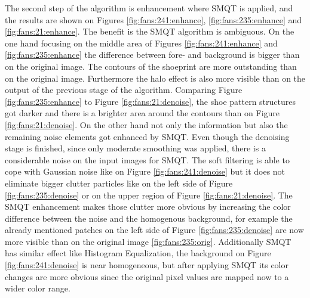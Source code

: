 \documentclass[draft,final]{vutinfth} %
\begin{document}
\par
The second step of the algorithm is enhancement where SMQT is applied, and the results are shown on Figures \ref{fig:fans:241:enhance}, \ref{fig:fans:235:enhance} and \ref{fig:fans:21:enhance}.
The benefit is the SMQT algorithm is ambiguous.
On the one hand focusing on the middle area of Figures  \ref{fig:fans:241:enhance} and \ref{fig:fans:235:enhance} the difference between fore- and background is bigger than on the original image.
The contours of the shoeprint are more outstanding than on the original image.
Furthermore the halo effect is also more visible than on the output of the previous stage of the algorithm.
Comparing Figure \ref{fig:fans:235:enhance} to Figure \ref{fig:fans:21:denoise}, the shoe pattern structures got darker and there is a brighter area around the contours than on Figure \ref{fig:fans:21:denoise}.
On the other hand not only the information but also the remaining noise elements got enhanced by SMQT.
Even though the denoising stage is finished, since only moderate smoothing was applied, there is a considerable noise on the input images for SMQT.
The soft filtering is able to cope with Gaussian noise like on Figure \ref{fig:fans:241:denoise} but it does not eliminate bigger clutter particles like on the left side of Figure \ref{fig:fans:235:denoise} or on the upper region of Figure \ref{fig:fans:21:denoise}.
The SMQT enhancement makes those clutter more obvious by increasing the color difference between the noise and the homogenous background, for example the already mentioned patches on the left side of Figure \ref{fig:fans:235:denoise} are now more visible than on the original image \ref{fig:fans:235:orig}.
Additionally SMQT has similar effect like Histogram Equalization, the background on Figure \ref{fig:fans:241:denoise} is near homogeneous, but after applying SMQT its color changes are more obvious since the original pixel values are mapped now to a wider color range.
\end{document}
